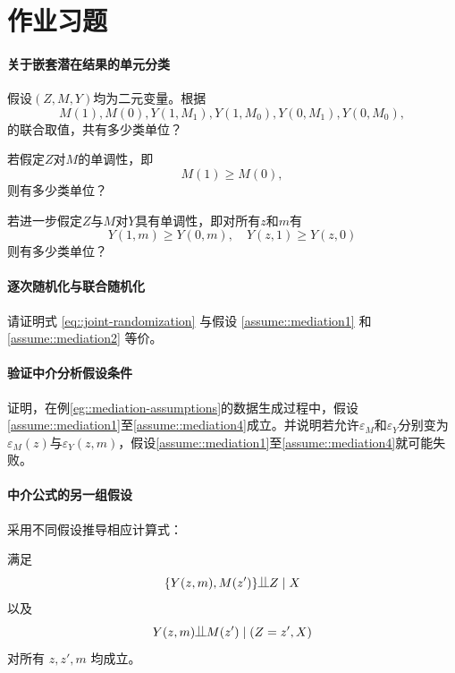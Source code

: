  

\section{作业习题}\label{chapter::mediation-problmes}



\paragraph{\citet{Robins::1992}关于嵌套潜在结果的单元分类}\label{hw::robins1992-latentgroups}


假设$(Z, M, Y)$均为二元变量。根据
$$
M(1), M(0),  Y(1, M_1), Y(1, M_0), Y(0, M_1), Y(0, M_0) ,
$$
的联合取值，共有多少类单位？

若假定$Z$对$M$的单调性，即
$$
M(1) \geq  M(0),
$$
则有多少类单位？

若进一步假定$Z$与$M$对$Y$具有单调性，即对所有$z$和$m$有
$$
Y(1, m) \geq Y(0, m),  \quad Y(z, 1) \geq Y(z, 0)
$$
则有多少类单位？


\paragraph{逐次随机化与联合随机化}\label{para::sr-jr}

请证明式 \eqref{eq::joint-randomization} 与假设 \ref{assume::mediation1} 和 \ref{assume::mediation2} 等价。 


\paragraph{验证中介分析假设条件}\label{para::mediation-assumptions-DGP}

证明，在例\ref{eg::mediation-assumptions}的数据生成过程中，假设\ref{assume::mediation1}至\ref{assume::mediation4}成立。并说明若允许$  \varepsilon_M$和$\varepsilon_Y$分别变为$ \varepsilon_M(z)$与$\varepsilon_Y(z,m)$，假设\ref{assume::mediation1}至\ref{assume::mediation4}就可能失败。 
 
 \paragraph{中介公式的另一组假设}\label{para::alternative-si}



\citet{Imai::2010}采用不同假设推导相应计算式： 

\begin{assumption}
\label{assume::mediation-imai}
满足
$$
\{Y(z, m), M(z') \} \ind  Z\mid X
$$
以及
$$
Y(z, m) \ind M(z' ) \mid (Z=z' , X)
$$
对所有 $z, z', m$ 均成立。
\end{assumption}


